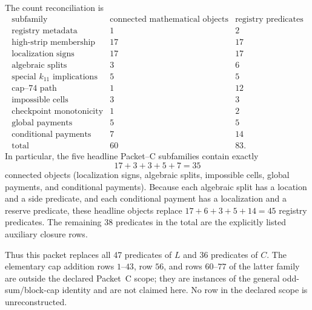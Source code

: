 \documentclass[11pt]{article}
\begin{document}
The count reconciliation is
\[
\begin{array}{c|c|c}
\text{subfamily}&\text{connected mathematical objects}
&\text{registry predicates}\\ \hline
\text{registry metadata}&1&2\\
\text{high-strip membership}&17&17\\
\text{localization signs}&17&17\\
\text{algebraic splits}&3&6\\
\text{special }k_{11}\text{ implications}&5&5\\
\text{cap--74 path}&1&12\\
\text{impossible cells}&3&3\\
\text{checkpoint monotonicity}&1&2\\
\text{global payments}&5&5\\
\text{conditional payments}&7&14\\ \hline
\text{total}&60&83.
\end{array}
\]
In particular, the five headline Packet--C subfamilies contain exactly
\[
 17+3+3+5+7=35
\]
connected objects (localization signs, algebraic splits, impossible cells,
global payments, and conditional payments).  Because each algebraic split
has a location and a side predicate, and each conditional payment has a
localization and a reserve predicate, these headline objects replace
\(17+6+3+5+14=45\) registry predicates.  The remaining 38 predicates in
the total are the explicitly listed auxiliary closure rows.

Thus this packet replaces all 47 predicates of \(L\) and 36 predicates of
\(C\).  The elementary cap addition rows \(1\)--\(43\), row \(56\), and
rows \(60\)--\(77\) of the latter family are
outside the declared Packet~C scope; they are instances of the general
odd-sum/block-cap identity and are not claimed here.  No row in the
declared scope is unreconstructed.
\end{document}

